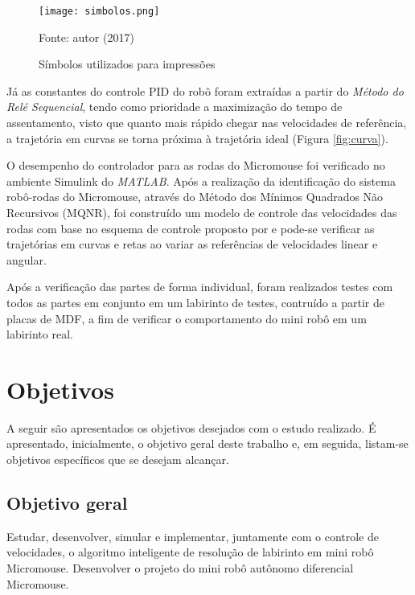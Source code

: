 
\begin{figure}[!htb]
	\caption{\label{fig:simbolos}Símbolos utilizados para impressões}
	\begin{center}
		\texttt{[image: simbolos.png]}
	\end{center}
	\centering
	\small Fonte: autor (2017)
\end{figure}



Já as constantes do controle PID do robô foram extraídas a partir do \emph{Método do Relé Sequencial}, tendo como prioridade a maximização do tempo de assentamento, visto que quanto mais rápido chegar nas velocidades de referência, a trajetória em curvas se torna próxima à trajetória ideal (Figura \ref{fig:curva}).

O desempenho do controlador para as rodas do Micromouse foi verificado no ambiente Simulink do \textit{MATLAB}. Após a realização da identificação do sistema robô-rodas do Micromouse, através do Método dos Mínimos Quadrados Não Recursivos (MQNR), foi construído um modelo de controle das velocidades das rodas com base no esquema de controle proposto por  e pode-se verificar as trajetórias em curvas e retas ao variar as referências de velocidades linear e angular.

Após a verificação das partes de forma individual, foram realizados testes com todos as partes em conjunto em um labirinto de testes, contruído a partir de placas de MDF, a fim de verificar o comportamento do mini robô em um labirinto real.

\section{Objetivos}
A seguir são apresentados os objetivos desejados com o estudo realizado. É apresentado, inicialmente, o objetivo geral deste trabalho e, em seguida, listam-se objetivos específicos que se desejam alcançar.

\subsection{Objetivo geral}
Estudar, desenvolver, simular e implementar, juntamente com o controle de velocidades, o algoritmo inteligente de resolução de labirinto em mini robô Micromouse. Desenvolver o projeto do mini robô autônomo diferencial Micromouse.

